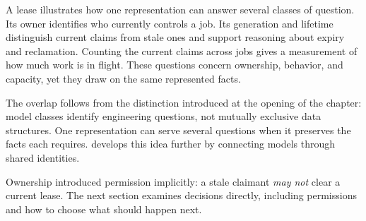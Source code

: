 
A lease illustrates how one representation can answer several classes of question. Its owner identifies who currently controls a job. Its generation and lifetime distinguish current claims from stale ones and support reasoning about expiry and reclamation. Counting the current claims across jobs gives a measurement of how much work is in flight. These questions concern ownership, behavior, and capacity, yet they draw on the same represented facts.


The overlap follows from the distinction introduced at the opening of the chapter: model classes identify engineering questions, not mutually exclusive data structures. One representation can serve several questions when it preserves the facts each requires.  develops this idea further by connecting models through shared identities.

Ownership introduced permission implicitly: a stale claimant \emph{may not} clear a current lease. The next section examines decisions directly, including permissions and how to choose what should happen next.
